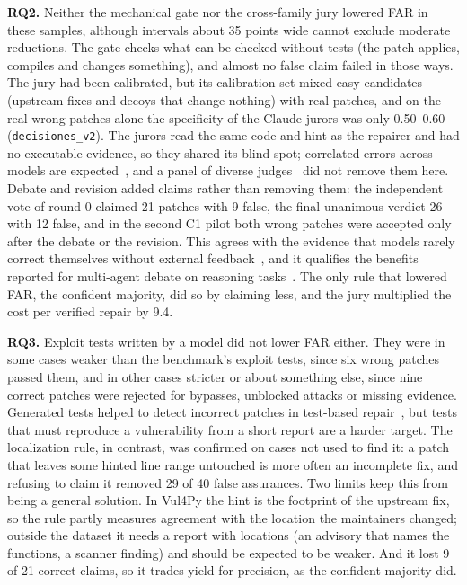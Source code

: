\documentclass[ai,article,submit,oneauthor]{Definitions/mdpi}
\begin{document}
\textbf{RQ2.} Neither the mechanical gate nor the cross-family jury lowered FAR in these samples, although intervals about 35 points wide cannot exclude moderate reductions. The gate checks what can be checked without tests (the patch applies, compiles and changes something), and almost no false claim failed in those ways. The jury had been calibrated, but its calibration set mixed easy candidates (upstream fixes and decoys that change nothing) with real patches, and on the real wrong patches alone the specificity of the Claude jurors was only 0.50--0.60 (\texttt{decisiones\_v2}). The jurors read the same code and hint as the repairer and had no executable evidence, so they shared its blind spot; correlated errors across models are expected~\cite{Kim2025CorrelatedErrorsIn}, and a panel of diverse judges~\cite{Verga2024ReplacingJudgesWith} did not remove them here. Debate and revision added claims rather than removing them: the independent vote of round 0 claimed 21 patches with 9 false, the final unanimous verdict 26 with 12 false, and in the second C1 pilot both wrong patches were accepted only after the debate or the revision. This agrees with the evidence that models rarely correct themselves without external feedback~\cite{Huang2024LargeLanguageModels}, and it qualifies the benefits reported for multi-agent debate on reasoning tasks~\cite{Du2024ImprovingFactualityAnd}. The only rule that lowered FAR, the confident majority, did so by claiming less, and the jury multiplied the cost per verified repair by 9.4.

\textbf{RQ3.} Exploit tests written by a model did not lower FAR either. They were in some cases weaker than the benchmark's exploit tests, since six wrong patches passed them, and in other cases stricter or about something else, since nine correct patches were rejected for bypasses, unblocked attacks or missing evidence. Generated tests helped to detect incorrect patches in test-based repair~\cite{Xiong2018IdentifyingPatchCorrectness}, but tests that must reproduce a vulnerability from a short report are a harder target. The localization rule, in contrast, was confirmed on cases not used to find it: a patch that leaves some hinted line range untouched is more often an incomplete fix, and refusing to claim it removed 29 of 40 false assurances. Two limits keep this from being a general solution. In Vul4Py the hint is the footprint of the upstream fix, so the rule partly measures agreement with the location the maintainers changed; outside the dataset it needs a report with locations (an advisory that names the functions, a scanner finding) and should be expected to be weaker. And it lost 9 of 21 correct claims, so it trades yield for precision, as the confident majority did.
\end{document}
